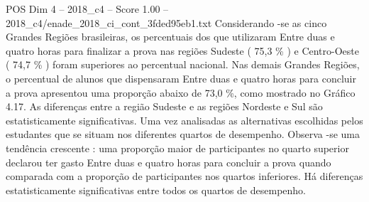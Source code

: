 \begin{textsample}{POS Dim 4 – 2018\_c4 – Score 1.00 – 2018\_c4/enade\_2018\_ci\_cont\_3fded95eb1.txt}
Considerando -se as cinco Grandes Regiões brasileiras, os percentuais dos que utilizaram Entre duas e quatro horas para finalizar a prova nas regiões Sudeste ( 75,3 \% ) e Centro-Oeste ( 74,7 \% ) foram superiores ao percentual nacional.
Nas demais Grandes Regiões, o percentual de alunos que dispensaram Entre duas e quatro horas para concluir a prova apresentou uma proporção abaixo de 73,0 \%, como mostrado no Gráfico 4.17.
As diferenças entre a região Sudeste e as regiões Nordeste e Sul são estatisticamente significativas.
Uma vez analisadas as alternativas escolhidas pelos estudantes que se situam nos diferentes quartos de desempenho.
Observa -se uma tendência crescente : uma proporção maior de participantes no quarto superior declarou ter gasto Entre duas e quatro horas para concluir a prova quando comparada com a proporção de participantes nos quartos inferiores.
Há diferenças estatisticamente significativas entre todos os quartos de desempenho.

\end{textsample}
